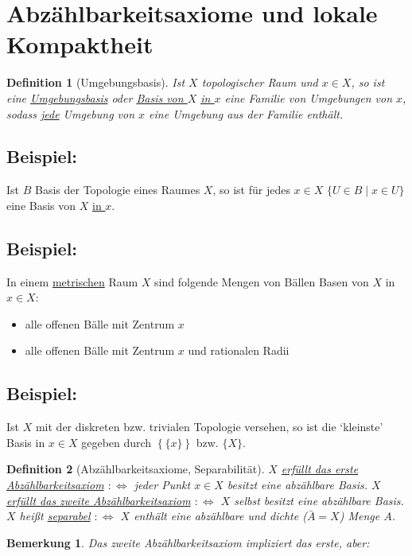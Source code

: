 \documentclass[a4paper,11pt,notitlepage]{report}
\newtheorem{definition}{Definition}[chapter]
\newtheorem{remark}{Bemerkung}[chapter]
\newenvironment{bsp}[1]
{
\setlength{\fboxsep}{10pt}
\subsection*{Beispiel: #1}
\begin{upshape}
}
{
\end{upshape}
}
\begin{document}
\newpage
\section{Abzählbarkeitsaxiome und lokale Kompaktheit}
\begin{definition}[Umgebungsbasis]
	Ist $X$ topologischer Raum und $x \in X$, so ist eine \underline{Umgebungsbasis} oder \underline{Basis von $X$} \underline{\underline{in $x$}} eine Familie von Umgebungen von $x$, sodass \underline{jede} Umgebung von $x$ eine Umgebung aus der Familie enthält.
\end{definition}

\begin{bsp}{}
	Ist $B$ Basis der Topologie eines Raumes $X$, so ist für jedes $x \in X$ $\{U \in B \mid x \in U\}$ eine Basis von $X$ \underline{\underline{in $x$}}.
\end{bsp}

\begin{bsp}{}
	In einem \underline{metrischen} Raum $X$ sind folgende Mengen von Bällen Basen von $X$ in $x \in X$:
	\begin{itemize}
		\item alle offenen Bälle mit Zentrum $x$
		\item alle offenen Bälle mit Zentrum $x$ und rationalen Radii
	\end{itemize}
\end{bsp}

\begin{bsp}{}
	\label{UmgebungsbasisDiskreteTopologie}
	Ist $X$ mit der diskreten bzw. trivialen Topologie versehen, so ist die `kleinste' Basis in $x \in X$ gegeben durch $\left\{\{x\}\right\}$ bzw. $\{X\}$.
\end{bsp}

\begin{definition}[Abzählbarkeitsaxiome, Separabilität]
	$X$ \underline{erfüllt das erste Abzählbarkeitsaxiom}
	$:\Leftrightarrow$ jeder Punkt $x \in X$ besitzt eine abzählbare Basis.
	\newline
	$X$ \underline{erfüllt das zweite Abzählbarkeitsaxiom}
	$:\Leftrightarrow$ $X$ selbst besitzt eine abzählbare Basis.
	\newline
	$X$ heißt \underline{separabel} $:\Leftrightarrow$ $X$ enthält eine abzählbare und dichte ($\bar{A} = X$) Menge $A$.
\end{definition}
 
\begin{remark}
	Das zweite Abzählbarkeitsaxiom impliziert das erste, aber:
\end{remark} 
\end{document}
